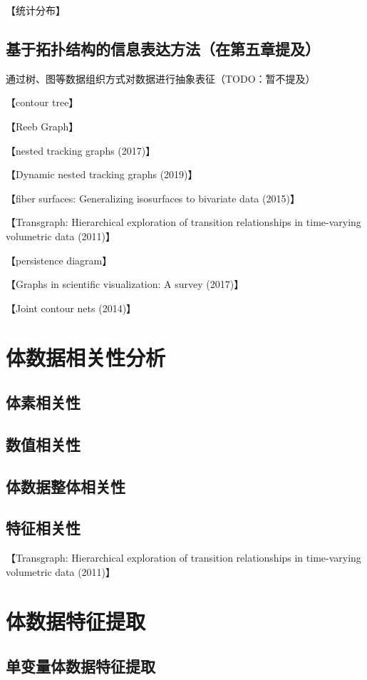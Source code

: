 【统计分布】

\subsection{基于拓扑结构的信息表达方法（在第五章提及）}

通过树、图等数据组织方式对数据进行抽象表征（TODO：暂不提及）

【contour tree】

【Reeb Graph】

【nested tracking graphs (2017)】

【Dynamic nested tracking graphs (2019)】

【fiber surfaces: Generalizing isosurfaces to bivariate data (2015)】

【Transgraph: Hierarchical exploration of transition relationships in time-varying volumetric data (2011)】

【persistence diagram】

【Graphs in scientific visualization: A survey (2017)】

【Joint contour nets (2014)】


\section{体数据相关性分析}
\subsection{体素相关性}
\subsection{数值相关性}
\subsection{体数据整体相关性}
\subsection{特征相关性}

【Transgraph: Hierarchical exploration of transition relationships in time-varying volumetric data (2011)】

\section{体数据特征提取}
\subsection{单变量体数据特征提取}

